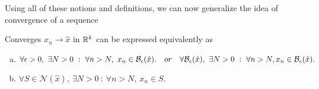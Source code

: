 Using all of these notions and definitions, we can now generalize the idea of convergence of a sequence
\begin{propbox}
	Converges $x_n \to \hat{x}$ in $\mathbb{R}^k$ can be expressed equivalently as 
	\begin{enumerate}[(a)]
		\item $\forall \epsilon>0,\ \exists N>0\ :\ \forall n>N,\ x_n \in \mathcal{B}_{\epsilon}(\hat{x}). \quad or \quad \forall \mathcal{B}_{\epsilon}(\hat{x}),\ \exists N>0\ :\ \forall n>N, x_n \in \mathcal{B}_{\epsilon}(\hat{x}). $
		\item $\forall S \in \mathcal{N}(\hat{x}),\ \exists N>0\ :\ \forall n>N,\ x_n \in S.$
	\end{enumerate}
\end{propbox}





